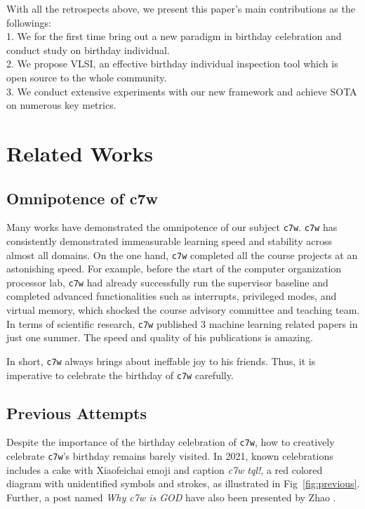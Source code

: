 \documentclass[10pt,twocolumn,letterpaper]{article}
\begin{document}
With all the retrospects above, we present this paper's main contributions as the followings: \\
1. We for the first time bring out a new paradigm in birthday celebration and conduct study on birthday individual.\\
2. We propose VLSI, an effective birthday individual inspection tool which is open source to the whole community. \\
3. We conduct extensive experiments with our new framework and achieve SOTA on numerous key metrics.\\

\section{Related Works}
\label{sec:related-works}
\subsection{Omnipotence of c7w}
Many works have demonstrated the omnipotence of our subject \verb|c7w|. \verb|c7w| has consistently demonstrated immeasurable learning speed and stability across almost all domains. On the one hand, \verb|c7w| completed all the course projects at an astonishing speed. For example, before the start of the computer organization processor lab, \verb|c7w| had already successfully run the supervisor baseline and completed advanced functionalities such as interrupts, privileged modes, and virtual memory, which shocked the course advisory committee and teaching team. In terms of scientific research, \verb|c7w| published 3 machine learning related papers in just one summer. The speed and quality of his publications is amazing.

In short, \verb|c7w| always brings about ineffable joy to his friends. Thus, it is imperative to celebrate the birthday of \verb|c7w| carefully.

\subsection{Previous Attempts}
Despite the importance of the birthday celebration of \verb|c7w|, how to creatively celebrate \verb|c7w|'s birthday remains barely visited. In 2021, known celebrations includes a cake with Xiaofeichai emoji and caption \emph{c7w tql!}, a red colored diagram with unidentified symbols and strokes, as illustrated in Fig~\ref{fig:previous}. Further, a post named \emph{Why c7w is GOD} have also been presented by Zhao \etal. 
\end{document}
